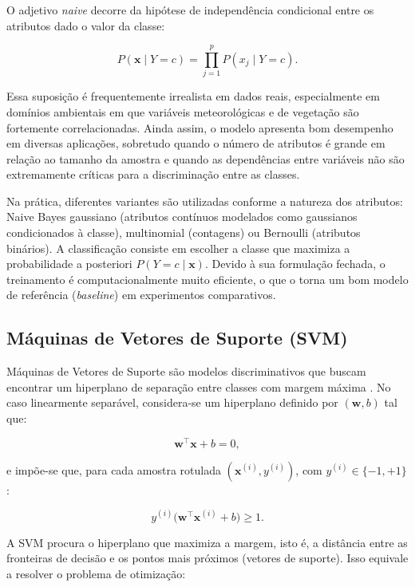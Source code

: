 O adjetivo \emph{naive} decorre da hipótese de independência condicional entre os atributos dado o valor da classe:

\begin{equation}
P(\mathbf{x} \mid Y=c) = \prod_{j=1}^p P(x_j \mid Y=c).
\end{equation}

Essa suposição é frequentemente irrealista em dados reais, especialmente em domínios ambientais em que variáveis meteorológicas e de vegetação são fortemente correlacionadas. Ainda assim, o modelo apresenta bom desempenho em diversas aplicações, sobretudo quando o número de atributos é grande em relação ao tamanho da amostra e quando as dependências entre variáveis não são extremamente críticas para a discriminação entre as classes.

Na prática, diferentes variantes são utilizadas conforme a natureza dos atributos: Naive Bayes gaussiano (atributos contínuos modelados como gaussianos condicionados à classe), multinomial (contagens) ou Bernoulli (atributos binários). A classificação consiste em escolher a classe que maximiza a probabilidade a posteriori $P(Y=c \mid \mathbf{x})$. Devido à sua formulação fechada, o treinamento é computacionalmente muito eficiente, o que o torna um bom modelo de referência (\textit{baseline}) em experimentos comparativos.

\subsection{Máquinas de Vetores de Suporte (SVM)}

Máquinas de Vetores de Suporte são modelos discriminativos que buscam encontrar um hiperplano de separação entre classes com margem máxima \cite{cortes1995svm}. No caso linearmente separável, considera-se um hiperplano definido por $(\mathbf{w}, b)$ tal que:

\begin{equation}
\mathbf{w}^\top \mathbf{x} + b = 0,
\end{equation}

e impõe-se que, para cada amostra rotulada $(\mathbf{x}^{(i)}, y^{(i)})$, com $y^{(i)} \in \{-1, +1\}$:

\begin{equation}
y^{(i)} \bigl(\mathbf{w}^\top \mathbf{x}^{(i)} + b\bigr) \geq 1.
\end{equation}

A SVM procura o hiperplano que maximiza a margem, isto é, a distância entre as fronteiras de decisão e os pontos mais próximos (vetores de suporte). Isso equivale a resolver o problema de otimização:


